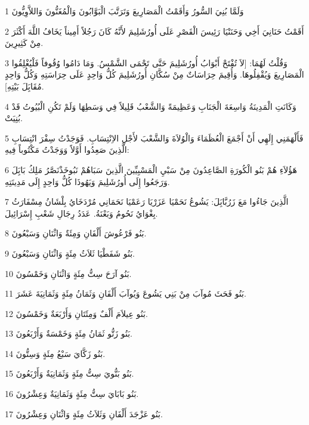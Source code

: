 \par 1 وَلَمَّا بُنِيَ السُّورُ وَأَقَمْتُ الْمَصَارِيعَ وَتَرَتَّبَ الْبَوَّابُونَ وَالْمُغَنُّونَ وَاللاَّوِيُّونَ
\par 2 أَقَمْتُ حَنَانِيَ أَخِي وَحَنَنْيَا رَئِيسَ الْقَصْرِ عَلَى أُورُشَلِيمَ لأَنَّهُ كَانَ رَجُلاً أَمِيناً يَخَافُ اللَّهَ أَكْثَرَ مِنْ كَثِيرِينَ.
\par 3 وَقُلْتُ لَهُمَا: [لاَ تُفْتَحْ أَبْوَابُ أُورُشَلِيمَ حَتَّى تَحْمَى الشَّمْسُ. وَمَا دَامُوا وُقُوفاً فَلْيُغْلِقُوا الْمَصَارِيعَ وَيُقْفِلُوهَا. وَأُقِيمَ حِرَاسَاتٌ مِنْ سُكَّانِ أُورُشَلِيمَ كُلُّ وَاحِدٍ عَلَى حِرَاسَتِهِ وَكُلُّ وَاحِدٍ مُقَابَِلَ بَيْتِهِ].
\par 4 وَكَانَتِ الْمَدِينَةُ وَاسِعَةَ الْجَنَابِ وَعَظِيمَةً وَالشَّعْبُ قَلِيلاً فِي وَسَطِهَا وَلَمْ تَكُنِ الْبُيُوتُ قَدْ بُنِيَتْ.
\par 5 فَأَلْهَمَنِي إِلَهِي أَنْ أَجْمَعَ الْعُظَمَاءَ وَالْوُلاَةَ وَالشَّعْبَ لأَجْلِ الاِنْتِسَابِ. فَوَجَدْتُ سِفْرَ انْتِسَابِ الَّذِينَ صَعِدُوا أَوَّلاً وَوَجَدْتُ مَكْتُوباً فِيهِ:
\par 6 هَؤُلاَءِ هُمْ بَنُو الْكُورَةِ الصَّاعِدُونَ مِنْ سَبْيِ الْمَسْبِيِّينَ الَّذِينَ سَبَاهُمْ نَبُوخَذْنَصَّرُ مَلِكُ بَابَِلَ وَرَجَعُوا إِلَى أُورُشَلِيمَ وَيَهُوذَا كُلُّ وَاحِدٍ إِلَى مَدِينَتِهِ.
\par 7 الَّذِينَ جَاءُوا مَعَ زَرُبَّابَِلَ: يَشُوعُ نَحَمْيَا عَزَرْيَا رَعَمْيَا نَحَمَانِي مُرْدَخَايُ بِلْشَانُ مِسْفَارَثُ بِغْوَايُ نَحُومُ وَبَعْنَةُ. عَدَدُ رِجَالِ شَعْبِ إِسْرَائِيلَ.
\par 8 بَنُو فَرْعُوشَ أَلْفَانِ وَمِئَةٌ وَاثْنَانِ وَسَبْعُونَ.
\par 9 بَنُو شَفَطْيَا ثَلاَثُ مِئَةٍ وَاثْنَانِ وَسَبْعُونَ.
\par 10 بَنُو آرَحَ سِتُّ مِئَةٍ وَاثْنَانِ وَخَمْسُونَ.
\par 11 بَنُو فَحَثَ مُوآبَ مِنْ بَنِي يَشُوعَ وَيُوآبَ أَلْفَانِ وَثَمَانُ مِئَةٍ وَثَمَانِيَةَ عَشَرَ.
\par 12 بَنُو عِيلاَمَ أَلْفٌ وَمِئَتَانِ وَأَرْبَعَةٌ وَخَمْسُونَ.
\par 13 بَنُو زَتُّو ثَمَانُ مِئَةٍ وَخَمْسَةٌ وَأَرْبَعُونَ.
\par 14 بَنُو زَكَّايَ سَبْعُ مِئَةٍ وَسِتُّونَ.
\par 15 بَنُو بَنُّويَ سِتُّ مِئَةٍ وَثَمَانِيَةٌ وَأَرْبَعُونَ.
\par 16 بَنُو بَابَايَ سِتُّ مِئَةٍ وَثَمَانِيَةٌ وَعِشْرُونَ.
\par 17 بَنُو عَزْجَدَ أَلْفَانِ وَثَلاَثُ مِئَةٍ وَاثْنَانِ وَعِشْرُونَ.
